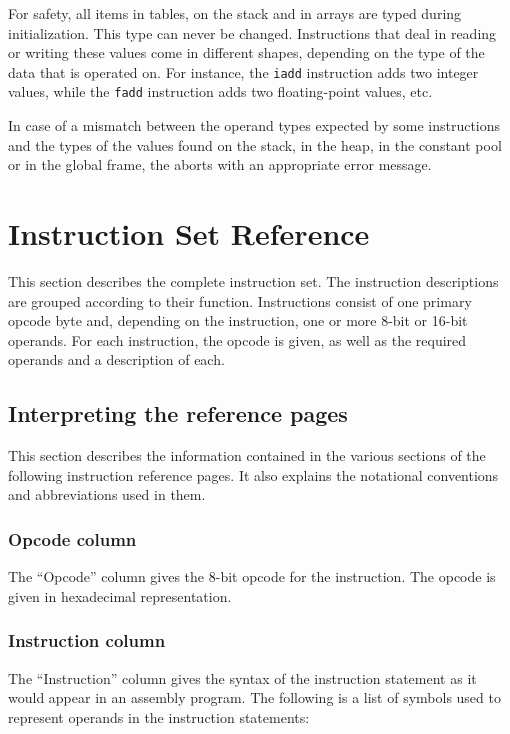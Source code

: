 For safety, all items in tables, on the stack and in arrays are typed during initialization. This type can never be changed. Instructions that deal in reading or writing these values come in different shapes, depending on the type of the data that is operated on. For instance, the \texttt{iadd} instruction adds two integer values, while the \texttt{fadd} instruction adds two floating-point values, etc.

In case of a mismatch between the operand types expected by some instructions and the types of the values found on the stack, in the heap, in the constant pool or in the global frame, the \civicvm{} aborts with an appropriate error message.

\section{Instruction Set Reference}

This section describes the complete \civicvm{} instruction set. The instruction descriptions are grouped according to their function. Instructions consist of one primary opcode byte and, depending on the instruction, one or more 8-bit or 16-bit operands. For each instruction, the opcode is given, as well as the required operands and a description of each.

\subsection{Interpreting the reference pages}

This section describes the information contained in the various sections of the following instruction reference pages. It also explains the notational conventions and abbreviations used in them.

\subsubsection{Opcode column}

The ``Opcode'' column gives the 8-bit opcode for the instruction. The opcode is given in hexadecimal representation.

\subsubsection{Instruction column}

The ``Instruction'' column gives the syntax of the instruction statement as it would appear in an assembly program. The following is a list of symbols used to represent operands in the instruction statements:

